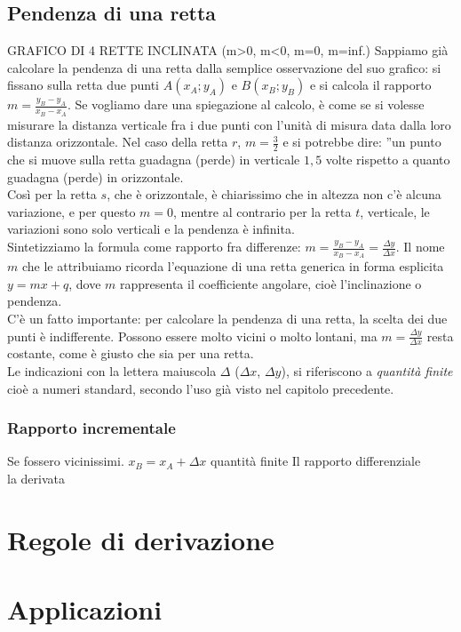 \subsection{Pendenza di una retta}
\label{subsec:diff01_pendretta}
GRAFICO DI 4 RETTE INCLINATA (m>0, m<0, m=0, m=inf.)
Sappiamo già calcolare la pendenza di una retta dalla semplice osservazione 
del suo grafico: si fissano sulla retta due punti $A(x_A; y_A)$ e $B(x_B; y_B)$
e si calcola il rapporto $m=\frac{y_B-y_A}{x_B-x_A}$. Se vogliamo dare una
spiegazione al calcolo, è come se si volesse misurare la distanza verticale
fra i due punti con l'unità di misura data dalla loro distanza orizzontale. 
Nel caso della retta $r$, $m=\frac{3}{2}$ e si potrebbe dire: ''un punto che si 
muove sulla retta guadagna (perde) in verticale $1,5$ volte rispetto a 
quanto guadagna (perde) in orizzontale.\\
Così per la retta $s$, che è orizzontale, è chiarissimo che in altezza
non c'è alcuna variazione, e per questo $m=0$, mentre al contrario per la
retta $t$, verticale, le variazioni sono solo verticali e la pendenza è
infinita.\\
Sintetizziamo la formula come rapporto fra differenze:
$m=\frac{y_B-y_A}{x_B-x_A}=\frac{\Delta y}{\Delta x}$. Il nome $m$ che 
le attribuiamo ricorda l'equazione di una retta generica in forma esplicita
$y=mx+q$, dove $m$ rappresenta il coefficiente angolare, cioè l'inclinazione
o pendenza.\\
C'è un fatto importante: per calcolare la pendenza di una retta, 
la scelta dei due punti è indifferente. Possono essere molto vicini o molto 
lontani, ma $m=\frac{\Delta y}{\Delta x}$ resta costante, come è giusto
che sia per una retta.\\
Le indicazioni con  la lettera maiuscola $\Delta$ ($\Delta x$, $\Delta y$),
si riferiscono a \emph{quantità finite}
cioè a numeri standard, secondo l'uso già visto nel capitolo precedente.

\subsubsection{Rapporto incrementale}
\label{subsubsec:diff01_rappincr}

Se fossero vicinissimi. $x_B=x_A+\Delta x$ quantità finite
Il rapporto differenziale\\
la derivata\\


\section{Regole di derivazione}
\label{sec:diff02_regolederivate}

\section{Applicazioni}
\label{sec:diff02_applicazioni}
